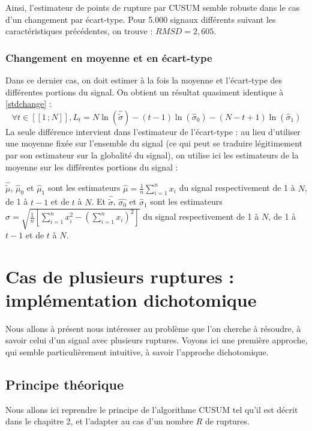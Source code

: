 \documentclass[french,11pt,notitlepage]{report}
\begin{document}
	Ainsi, l'estimateur de points de rupture par CUSUM semble robuste dans le cas d'un changement par écart-type. Pour 5.000 signaux différents suivant les caractéristiques précédentes, on trouve : $RMSD = 2,605$.
	
	
	\subsection{Changement en moyenne et en écart-type}
	
	
	Dans ce dernier cas, on doit estimer à la fois la moyenne et l'écart-type des différentes portions du signal. On obtient un résultat quasiment identique à \ref{stdchange} :
	\begin{equation}
		\forall t \in [\![1\,;N]\!], L_t = N\ln (\hat{\tilde\sigma}) - (t-1) \ln (\hat\sigma_0) - (N - t + 1) \ln (\hat\sigma_1)
		\label{bothchange}
	\end{equation}
	La seule différence intervient dans l'estimateur de l'écart-type :
	au lieu d'utiliser une moyenne fixée sur l'ensemble du signal (ce qui peut se traduire légitimement par son estimateur sur la globalité du signal),
	on utilise ici les estimateurs  de la moyenne sur les différentes portions du signal :
	
	$\hat{\tilde\mu}$, $\hat\mu_0$ et $\hat\mu_1$ sont les estimateurs $\hat\mu=\frac1n\sum_{i=1}^nx_i$ du signal respectivement de 1 à $N$, de 1 à $t-1$ et de $t$ à $N$.
	Et $\hat{\tilde\sigma}$, $\hat{\sigma_0}$ et $\hat\sigma_1$ sont les estimateurs $\hat\sigma=\sqrt{\frac1n\left[\sum_{i=1}^nx_i^2-(\sum_{i=1}^nx_i)^2\right]}$ du signal respectivement de 1 à $N$, de 1 à $t-1$ et de $t$ à $N$.	

	
	
	\chapter{Cas de plusieurs ruptures : implémentation dichotomique}
	 	Nous allons à présent nous intéresser au problème que l'on cherche à résoudre, à savoir celui d'un signal avec plusieurs ruptures. Voyons ici une première approche, qui semble particulièrement intuitive, à savoir l'approche dichotomique.
	  
	 	\section{Principe théorique}
	 	Nous allons ici reprendre le principe de l'algorithme CUSUM tel qu'il est décrit dans le chapitre 2, et l'adapter au cas d'un nombre $R$ de ruptures.
	 	\\
	 	
\end{document}
